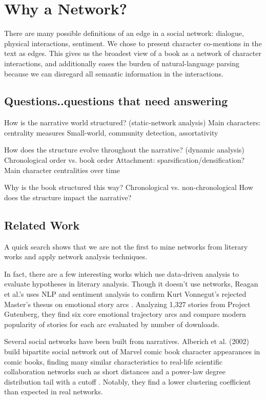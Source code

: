 \section{Why a Network?}

There are many possible definitions of an edge in a social network: dialogue, physical interactions, sentiment. 
We chose to present character co-mentions in the text as edges. 
This gives us the broadest view of a book as a network of character interactions, and additionally eases the burden of natural-language parsing because we can disregard all semantic information in the interactions.

\subsection{Questions..questions that need answering}

How is the narrative world structured? (static-network analysis)
Main characters: centrality measures
Small-world, community detection, assortativity


How does the structure evolve throughout the narrative? (dynamic analysis)
Chronological order vs. book order
Attachment: sparsification/densification?
Main character centralities over time


Why is the book structured this way?
Chronological vs. non-chronological
How does the structure impact the narrative?


\subsection{Related Work}

A quick search shows that we are not the first to mine networks from literary works and apply network analysis techniques.

In fact, there are a few interesting works which use data-driven analysis to evaluate hypotheses in literary analysis. 
Though it doesn't use networks, Reagan et al.'s uses NLP and sentiment analysis to confirm Kurt Vonnegut's rejected Master's thesus on emotional story arcs \cite{Reagan2016}. 
Analyzing 1,327 stories from Project Gutenberg, they find six core emotional trajectory arcs and compare modern popularity of stories for each arc evaluated by number of downloads.

Several social networks have been built from narratives. 
Alberich et al. (2002) build bipartite social network out of Marvel comic book character appearances in comic books, finding many similar characteristics to real-life scientific collaboration networks such as short distances and a power-law degree distribution tail with a cutoff \cite{2002marvel}. Notably, they find a lower clustering coefficient than expected in real networks.

